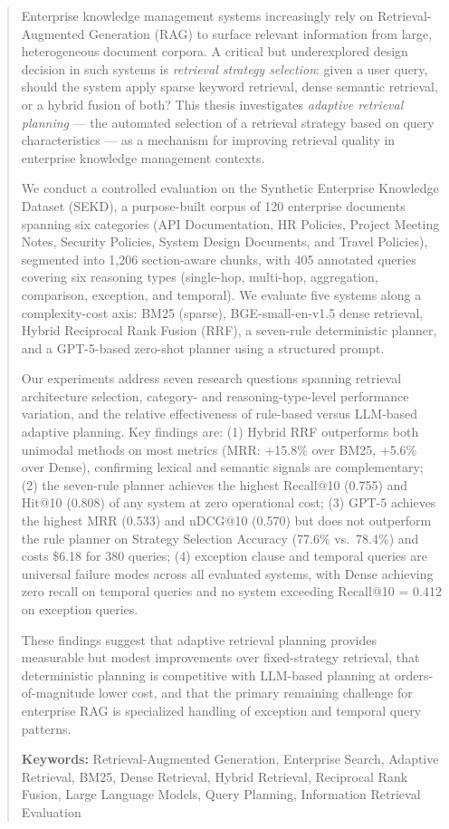 \begin{abstract}

Enterprise knowledge management systems increasingly rely on Retrieval-Augmented Generation (RAG) to surface relevant information from large, heterogeneous document corpora. A critical but underexplored design decision in such systems is \emph{retrieval strategy selection}: given a user query, should the system apply sparse keyword retrieval, dense semantic retrieval, or a hybrid fusion of both? This thesis investigates \emph{adaptive retrieval planning} — the automated selection of a retrieval strategy based on query characteristics — as a mechanism for improving retrieval quality in enterprise knowledge management contexts.

We conduct a controlled evaluation on the Synthetic Enterprise Knowledge Dataset (SEKD), a purpose-built corpus of 120 enterprise documents spanning six categories (API Documentation, HR Policies, Project Meeting Notes, Security Policies, System Design Documents, and Travel Policies), segmented into 1,206 section-aware chunks, with 405 annotated queries covering six reasoning types (single-hop, multi-hop, aggregation, comparison, exception, and temporal). We evaluate five systems along a complexity-cost axis: BM25 (sparse), BGE-small-en-v1.5 dense retrieval, Hybrid Reciprocal Rank Fusion (RRF), a seven-rule deterministic planner, and a GPT-5-based zero-shot planner using a structured prompt.

Our experiments address seven research questions spanning retrieval architecture selection, category- and reasoning-type-level performance variation, and the relative effectiveness of rule-based versus LLM-based adaptive planning. Key findings are: (1) Hybrid RRF outperforms both unimodal methods on most metrics (MRR: +15.8\% over BM25, +5.6\% over Dense), confirming lexical and semantic signals are complementary; (2) the seven-rule planner achieves the highest Recall@10 (0.755) and Hit@10 (0.808) of any system at zero operational cost; (3) GPT-5 achieves the highest MRR (0.533) and nDCG@10 (0.570) but does not outperform the rule planner on Strategy Selection Accuracy (77.6\% vs.\ 78.4\%) and costs \$6.18 for 380 queries; (4) exception clause and temporal queries are universal failure modes across all evaluated systems, with Dense achieving zero recall on temporal queries and no system exceeding Recall@10 = 0.412 on exception queries.

These findings suggest that adaptive retrieval planning provides measurable but modest improvements over fixed-strategy retrieval, that deterministic planning is competitive with LLM-based planning at orders-of-magnitude lower cost, and that the primary remaining challenge for enterprise RAG is specialized handling of exception and temporal query patterns.

\bigskip
\noindent\textbf{Keywords:} Retrieval-Augmented Generation, Enterprise Search, Adaptive Retrieval, BM25, Dense Retrieval, Hybrid Retrieval, Reciprocal Rank Fusion, Large Language Models, Query Planning, Information Retrieval Evaluation

\end{abstract}
